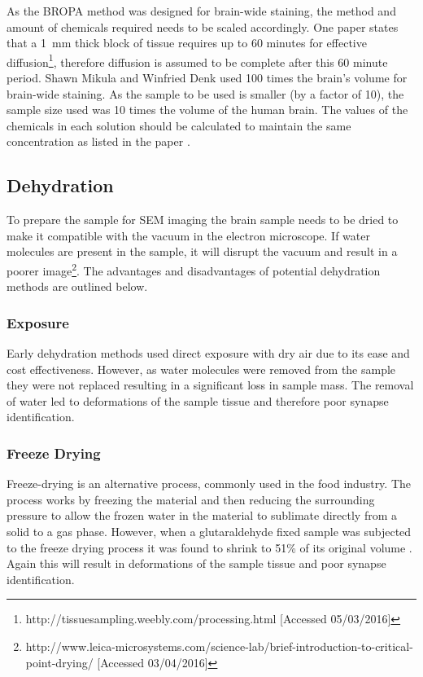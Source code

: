 \documentclass[a4paper, 11pt]{article}
\numberwithin{equation}{section}
\begin{document}
As the BROPA method was designed for brain-wide staining, the method and amount of chemicals required needs to be scaled accordingly. One paper states that a \SI{1}{\milli\meter} thick block of tissue requires up to 60 minutes for effective diffusion\footnote{http://tissuesampling.weebly.com/processing.html [Accessed 05/03/2016]}, therefore diffusion is assumed to be complete after this 60 minute period. Shawn Mikula and Winfried Denk \cite{highres_em_staining} used 100 times the brain's volume for brain-wide staining. As the sample to be used is smaller (by a factor of 10), the sample size used was 10 times the volume of the human brain. The values of the chemicals in each solution should be calculated to maintain the same concentration as listed in the paper \cite{highres_em_staining}.
 

\subsection{Dehydration}
 	\label{Dehydrate}

To prepare the sample for SEM imaging the brain sample needs to be dried to make it compatible with the vacuum in the electron microscope. If water molecules are present in the sample, it will disrupt the vacuum and result in a poorer image\footnote{http://www.leica-microsystems.com/science-lab/brief-introduction-to-critical-point-drying/ [Accessed 03/04/2016]}. The advantages and disadvantages of potential dehydration methods are outlined below. 

\subsubsection{Exposure}

Early dehydration methods used direct exposure with dry air due to its ease and cost effectiveness. However, as water molecules were removed from the sample they were not replaced resulting in a significant loss in sample mass. The removal of water led to deformations of the sample tissue and therefore poor synapse identification. 

\subsubsection{Freeze Drying}

Freeze-drying is an alternative process, commonly used in the food industry. The process works by freezing the material and then reducing the surrounding pressure to allow the frozen water in the material to sublimate directly from a solid to a gas phase. However, when a glutaraldehyde fixed sample was subjected to the freeze drying process it was found to shrink to 51\% of its original volume \cite{freezedryingvscriticalpoint}. Again this will result in deformations of the sample tissue and poor synapse identification. 
\end{document}
